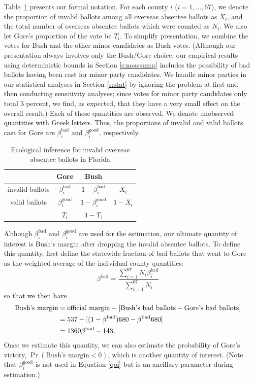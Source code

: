 \documentclass[11pt,titlepage]{article}
\newcommand{\bb}{\beta^{\text{bad}}}
\newcommand{\bg}{\beta^{\text{good}}}
\begin{document}
Table~\ref{tb:ei} presents our formal notation.  For each county $i$
($i=1,\dots,67$), we denote the proportion of invalid ballots among
all overseas absentee ballots as $X_i$, and the total number of
overseas absentee ballots which were counted as $N_i$.  We also let
Gore's proportion of the vote be $T_i$.  To simplify presentation, we
combine the votes for Bush and the other minor candidates as Bush
votes. (Although our presentation always involves only the Bush/Gore
choice, our empirical results using deterministic bounds in Section
\ref{s:noassump} includes the possibility of bad ballots having been
cast for minor party candidates.  We handle minor parties in our
statistical analyses in Section \ref{s:stat} by ignoring the problem
at first and then conducting sensitivity analyses; since votes for
minor party candidates only total 3 percent, we find, as expected,
that they have a very small effect on the overall result.)  Each of
these quantities are observed.  We denote unobserved quantities with
Greek letters.  Thus, the proportions of invalid and valid ballots
cast for Gore are $\bb_i$ and $\bg_i$, respectively.
\begin{table}[t]
\begin{center}
\begin{tabular}{cccc}
                & Gore  & Bush &         \\
\hline 
invalid ballots & $\bb_i$  & $1-\bb_i$ & $X_i$   \\
valid ballots   & $\bg_i$  & $1-\bg_i$ & $1-X_i$ \\
\hline
                & $T_i$ & $1-T_i$ &         \\
\end{tabular} \caption{Ecological inference for invalid overseas
  absentee ballots in Florida}\label{tb:ei}
\end{center}
\end{table} 

Although $\bb_i$ and $\bg_i$ are used for the estimation, our ultimate
quantity of interest is Bush's margin after dropping the invalid
absentee ballots.  To define this quantity, first define the statewide
fraction of bad ballots that went to Gore as the weighted average of
the individual county quantities:
\begin{equation}
  \bb=\frac{\sum_{i=1}^{67}N_i\bb_i}{\sum_{i=1}^{67}N_i}
\end{equation}
so that we then have
\begin{align}
  \text{Bush's margin} & = \text{official margin}
  - [\text{Bush's bad ballots} - \text{Gore's bad ballots}] \notag\\
  & = 537 - [(1-\bb)680-\bb 680]\notag\\
  & = 1360 \bb - 143. \label{qoi}
\end{align}
Once we estimate this quantity, we can also estimate the probability
of Gore's victory, $\Pr(\text{Bush's margin}<0)$, which is another
quantity of interest.  (Note that $\bg_i$ is not used in Equation
\ref{qoi} but is an ancillary parameter during estimation.)
\end{document}
